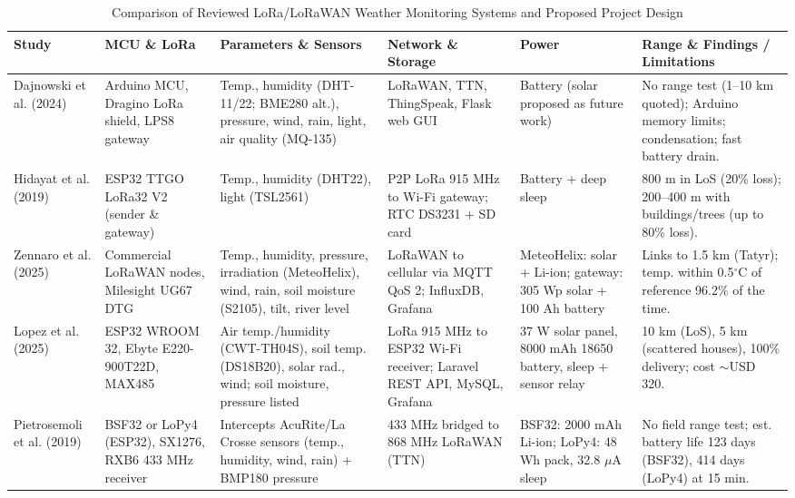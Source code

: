 \documentclass[conference,onecolumn]{IEEEtran}
\begin{document}
\begin{table}[!htbp]
\centering
\caption{Comparison of Reviewed LoRa/LoRaWAN Weather Monitoring Systems and Proposed Project Design}
\label{tab:comparison}
\scriptsize
\setlength{\tabcolsep}{3.5pt}
\renewcommand{\arraystretch}{0.91}
\begin{tabularx}{\textwidth}{L{1.8cm} L{2.4cm} L{3.8cm} L{2.8cm} L{2.5cm} Y}
\toprule
\textbf{Study} & \textbf{MCU \& LoRa} & \textbf{Parameters \& Sensors} & \textbf{Network \& Storage} & \textbf{Power} & \textbf{Range \& Findings / Limitations} \\
\midrule
Dajnowski et al. (2024) \cite{dajnowski2024} & Arduino MCU, Dragino LoRa shield, LPS8 gateway & Temp., humidity (DHT-11/22; BME280 alt.), pressure, wind, rain, light, air quality (MQ-135) & LoRaWAN, TTN, ThingSpeak, Flask web GUI & Battery (solar proposed as future work) & No range test (1--10 km quoted); Arduino memory limits; condensation; fast battery drain. \\
Hidayat et al. (2019) \cite{hidayat2019} & ESP32 TTGO LoRa32 V2 (sender \& gateway) & Temp., humidity (DHT22), light (TSL2561) & P2P LoRa 915 MHz to Wi-Fi gateway; RTC DS3231 + SD card & Battery + deep sleep & 800 m in LoS (20\% loss); 200--400 m with buildings/trees (up to 80\% loss). \\
Zennaro et al. (2025) \cite{zennaro2025} & Commercial LoRaWAN nodes, Milesight UG67 DTG & Temp., humidity, pressure, irradiation (MeteoHelix), wind, rain, soil moisture (S2105), tilt, river level & LoRaWAN to cellular via MQTT QoS 2; InfluxDB, Grafana & MeteoHelix: solar + Li-ion; gateway: 305 Wp solar + 100 Ah battery & Links to 1.5 km (Tatyr); temp. within 0.5$^\circ$C of reference 96.2\% of the time. \\
Lopez et al. (2025) \cite{lopez2025} & ESP32 WROOM 32, Ebyte E220-900T22D, MAX485 & Air temp./humidity (CWT-TH04S), soil temp. (DS18B20), solar rad., wind; soil moisture, pressure listed & LoRa 915 MHz to ESP32 Wi-Fi receiver; Laravel REST API, MySQL, Grafana & 37 W solar panel, 8000 mAh 18650 battery, sleep + sensor relay & 10 km (LoS), 5 km (scattered houses), 100\% delivery; cost $\sim$USD 320. \\
Pietrosemoli et al. (2019) \cite{pietrosemoli2019} & BSF32 or LoPy4 (ESP32), SX1276, RXB6 433 MHz receiver & Intercepts AcuRite/La Crosse sensors (temp., humidity, wind, rain) + BMP180 pressure & 433 MHz bridged to 868 MHz LoRaWAN (TTN) & BSF32: 2000 mAh Li-ion; LoPy4: 48 Wh pack, 32.8 $\mu$A sleep & No field range test; est. battery life 123 days (BSF32), 414 days (LoPy4) at 15 min. \\

\end{tabularx}
\end{table}
\end{document}
